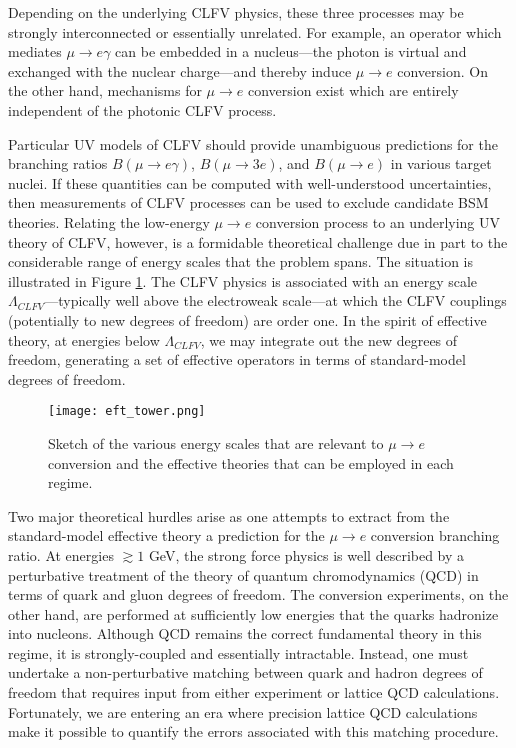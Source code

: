 \documentclass{book}[letterpaper,12pt]
\begin{document}
Depending on the underlying CLFV physics, these three processes may be strongly interconnected or essentially unrelated. For example, an operator which mediates $\mu\rightarrow e\gamma$ can be embedded in a nucleus---the photon is virtual and exchanged with the nuclear charge---and thereby induce $\mu\rightarrow e$ conversion. On the other hand, mechanisms for $\mu\rightarrow e$ conversion exist which are entirely independent of the photonic CLFV process. 

Particular UV models of CLFV should provide unambiguous predictions for the branching ratios $B(\mu\rightarrow e\gamma)$, $B(\mu\rightarrow 3e)$, and $B(\mu\rightarrow e)$ in various target nuclei. If these quantities can be computed with well-understood uncertainties, then measurements of CLFV processes can be used to exclude candidate BSM theories. Relating the low-energy $\mu\rightarrow e$ conversion process to an underlying UV theory of CLFV, however, is a formidable theoretical challenge due in part to the considerable range of energy scales that the problem spans. The situation is illustrated in Figure \ref{fig:eft_tower}. The CLFV physics is associated with an energy scale $\Lambda_{CLFV}$---typically well above the electroweak scale---at which the CLFV couplings (potentially to new degrees of freedom) are order one. In the spirit of effective theory, at energies below $\Lambda_{CLFV}$, we may integrate out the new degrees of freedom, generating a set of effective operators in terms of standard-model degrees of freedom.  

\begin{figure}
\centering
\texttt{[image: eft\_tower.png]}
\caption{Sketch of the various energy scales that are relevant to $\mu\rightarrow e$ conversion and the effective theories that can be employed in each regime.}
\label{fig:eft_tower}
\end{figure}

Two major theoretical hurdles arise as one attempts to extract from the standard-model effective theory a prediction for the $\mu\rightarrow e$ conversion branching ratio. At energies $\gtrsim 1$ GeV, the strong force physics is well described by a perturbative treatment of the theory of quantum chromodynamics (QCD) in terms of quark and gluon degrees of freedom. The conversion experiments, on the other hand, are performed at sufficiently low energies that the quarks hadronize into nucleons. Although QCD remains the correct fundamental theory in this regime, it is strongly-coupled and essentially intractable. Instead, one must undertake a non-perturbative matching between quark and hadron degrees of freedom that requires input from either experiment or lattice QCD calculations. Fortunately, we are entering an era where precision lattice QCD calculations make it possible to quantify the errors associated with this matching procedure. 
\end{document}
